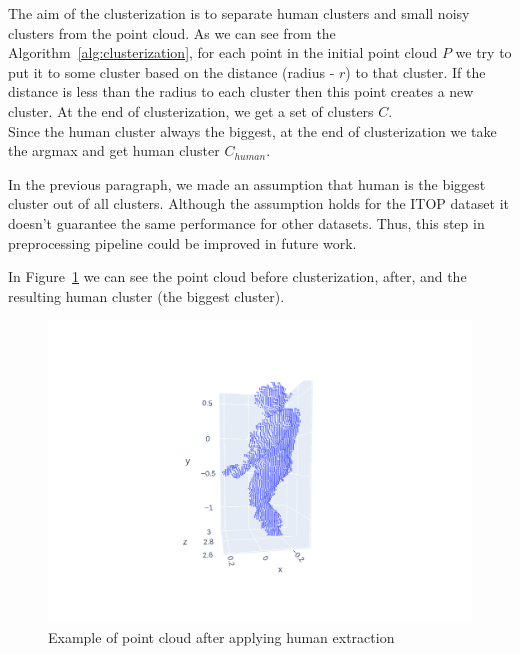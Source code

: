 The aim of the clusterization is to separate human clusters and small noisy clusters from the point cloud. As we can see from the Algorithm~\ref{alg:clusterization}, for each point in the initial point cloud $P$ we try to put it to some cluster based on the distance (radius - $r$) to that cluster. If the distance is less than the radius to each cluster then this point creates a new cluster. At the end of clusterization, we get a set of clusters $C$. \\
Since the human cluster always the biggest, at the end of clusterization we take the argmax and get human cluster $C_{human}$.

In the previous paragraph, we made an assumption that human is the biggest cluster out of all clusters. Although the assumption holds for the ITOP dataset it doesn't guarantee the same performance for other datasets. Thus, this step in preprocessing pipeline could be improved in future work.

In Figure~\ref{img:after-clustering} we can see the point cloud before clusterization, after, and the resulting human cluster (the biggest cluster).

\begin{figure}[hbt!]
    \centerline{
            \includegraphics[trim=850 400 700 200,clip,scale=.3]{Figures/example-after-segmentation.png}
    }
    \caption{Example of point cloud after applying human extraction}
    \label{img:after-clustering}
\end{figure}

